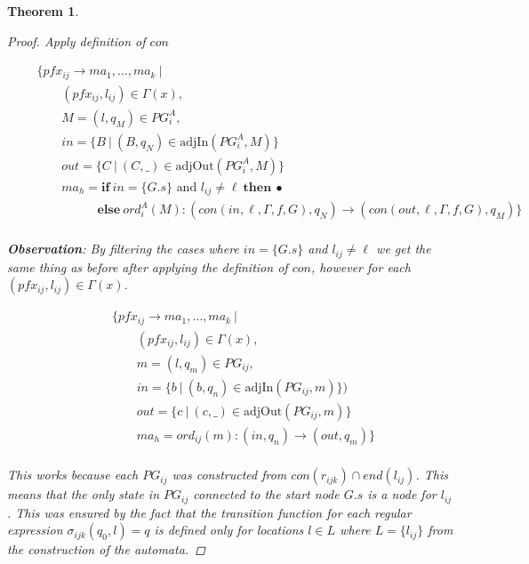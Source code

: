 \documentclass[twocolumn, openany]{sig-alternate-10pt}
\newtheorem{thm}{Theorem}
\begin{document}
\begin{thm}
\begin{proof}
  Apply definition of $con$

  \[ \begin{array}{l}
     ~~~~~~~~~ \{ pfx_{ij} \rightarrow ma_1, \dots, ma_k ~\vert~ \\
     ~~~~~~~~~~~~~~~~~~ (pfx_{ij}, l_{ij}) \in \Gamma(x), \\
     ~~~~~~~~~~~~~~~~~~ M = (l,q_M) \in PG^A_i, \\
     ~~~~~~~~~~~~~~~~~~ in = \{ B ~\vert~ (B,q_N) \in \text{adjIn}(PG^A_i,M) \} \\
     ~~~~~~~~~~~~~~~~~~ out = \{ C ~\vert~ (C,\_) \in \text{adjOut}(PG^A_i,M) \} \\
     ~~~~~~~~~~~~~~~~~~ ma_h = \textbf{if}~ in=\{ G.s \} \text{ and } l_{ij} \neq \ell ~\textbf{then}~ \bullet \\ 
     ~~~~~~~~~~~~~~~~~~~~~~~~~~~~~~~ \textbf{else}~ ord^A_i(M) : (con(in,\ell,\Gamma,f,G),q_N) \rightarrow (con(out,\ell,\Gamma,f,G),q_M) \} \\
  \end{array} \]%

  \textbf{Observation}: 
  By filtering the cases where $in = \{ G.s \}$ and $l_{ij} \neq \ell$ we get the same thing as before after applying the definition of $con$, however for each $(pfx_{ij}, l_{ij}) \in \Gamma(x)$.

 \[ \begin{array}{l}
     ~~~~~~~~~ \{ pfx_{ij} \rightarrow ma_1, \dots, ma_k ~\vert~ \\
     ~~~~~~~~~~~~~~~~~~ (pfx_{ij}, l_{ij}) \in \Gamma(x), \\
     ~~~~~~~~~~~~~~~~~~ m = (l,q_m) \in PG_{ij}, \\
     ~~~~~~~~~~~~~~~~~~ in = \{ b ~\vert~ (b,q_n) \in \text{adjIn}(PG_{ij},m) \}) \\
     ~~~~~~~~~~~~~~~~~~ out = \{ c ~\vert~ (c,\_) \in \text{adjOut}(PG_{ij},m) \} \\
     ~~~~~~~~~~~~~~~~~~ ma_h = ord_{ij}(m) : (in,q_n) \rightarrow (out,q_m) \} \\
  \end{array} \]%

  This works because each $PG_{ij}$ was constructed from $con(r_{ijk}) \cap end(l_{ij})$. This means that the only state in $PG_{ij}$ connected to the start node $G.s$ is a node for $l_{ij}$. This was ensured by the fact that the transition function for each regular expression $\sigma_{ijk}(q_0,l) = q$ is defined only for locations $l \in L$ where $L = \{ l_{ij} \}$ from the construction of the automata.


\end{proof}
\end{thm}
\end{document}
